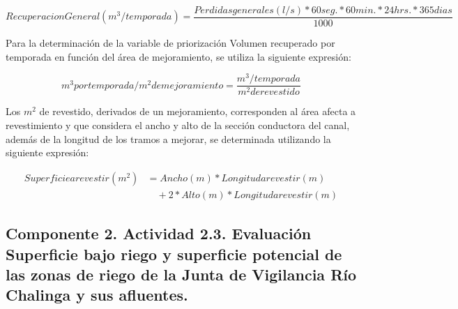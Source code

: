 \documentclass[]{article}
\begin{document}
\begin{equation}
RecuperacionGeneral(m^3/temporada)= \frac{Perdidas generales (l/s) * 60 seg. * 60 min. * 24 hrs. * 365 dias} {1000}  
\end{equation}

Para la determinación de la variable de priorización Volumen recuperado por temporada en función del área de mejoramiento, se utiliza la siguiente expresión:

\begin{equation}
m^3 por temporada/m^2 de mejoramiento = \frac{m^3/temporada} {m^2 de revestido}  
\end{equation}

Los $m^2$ de revestido, derivados de un mejoramiento, corresponden al área afecta a revestimiento y que considera el ancho y alto de la sección conductora del canal, además de la longitud de los tramos a mejorar, se determinada utilizando la siguiente expresión:

\begin{equation}
\begin{split}
	Superficie a revestir (m^2)& = Ancho (m) * Longitud a revestir (m)\\
	&\quad + 2 * Alto (m) * Longitud a revestir (m)  
\end{split}
\end{equation}
\clearpage
\subsection{Componente 2. Actividad 2.3. Evaluación Superficie bajo riego y superficie potencial de las zonas de riego de la Junta de Vigilancia Río Chalinga y sus afluentes.}
\end{document}
